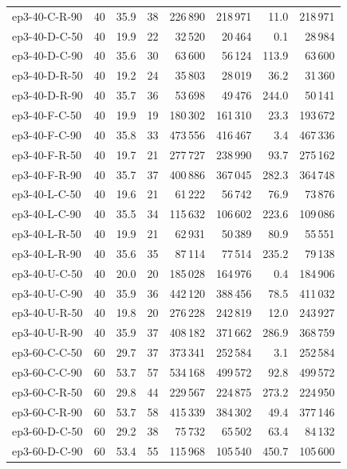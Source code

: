 \begin{longtable}{lrrrrrrr}
  ep3-40-C-R-90 & 40 & 35.9 & 38 & 226\,890 & 218\,971 & 11.0 & 218\,971 \\
  ep3-40-D-C-50 & 40 & 19.9 & 22 & 32\,520 & 20\,464 & 0.1 & 28\,984 \\
  ep3-40-D-C-90 & 40 & 35.6 & 30 & 63\,600 & 56\,124 & 113.9 & 63\,600 \\
  ep3-40-D-R-50 & 40 & 19.2 & 24 & 35\,803 & 28\,019 & 36.2 & 31\,360 \\
  ep3-40-D-R-90 & 40 & 35.7 & 36 & 53\,698 & 49\,476 & 244.0 & 50\,141 \\
  ep3-40-F-C-50 & 40 & 19.9 & 19 & 180\,302 & 161\,310 & 23.3 & 193\,672 \\
  ep3-40-F-C-90 & 40 & 35.8 & 33 & 473\,556 & 416\,467 & 3.4 & 467\,336 \\
  ep3-40-F-R-50 & 40 & 19.7 & 21 & 277\,727 & 238\,990 & 93.7 & 275\,162 \\
  ep3-40-F-R-90 & 40 & 35.7 & 37 & 400\,886 & 367\,045 & 282.3 & 364\,748 \\
  ep3-40-L-C-50 & 40 & 19.6 & 21 & 61\,222 & 56\,742 & 76.9 & 73\,876 \\
  ep3-40-L-C-90 & 40 & 35.5 & 34 & 115\,632 & 106\,602 & 223.6 & 109\,086 \\
  ep3-40-L-R-50 & 40 & 19.9 & 21 & 62\,931 & 50\,389 & 80.9 & 55\,551 \\
  ep3-40-L-R-90 & 40 & 35.6 & 35 & 87\,114 & 77\,514 & 235.2 & 79\,138 \\
  ep3-40-U-C-50 & 40 & 20.0 & 20 & 185\,028 & 164\,976 & 0.4 & 184\,906 \\
  ep3-40-U-C-90 & 40 & 35.9 & 36 & 442\,120 & 388\,456 & 78.5 & 411\,032 \\
  ep3-40-U-R-50 & 40 & 19.8 & 20 & 276\,228 & 242\,819 & 12.0 & 243\,927 \\
  ep3-40-U-R-90 & 40 & 35.9 & 37 & 408\,182 & 371\,662 & 286.9 & 368\,759 \\
  \addlinespace
  ep3-60-C-C-50 & 60 & 29.7 & 37 & 373\,341 & 252\,584 & 3.1 & 252\,584 \\
  ep3-60-C-C-90 & 60 & 53.7 & 57 & 534\,168 & 499\,572 & 92.8 & 499\,572 \\
  ep3-60-C-R-50 & 60 & 29.8 & 44 & 229\,567 & 224\,875 & 273.2 & 224\,950 \\
  ep3-60-C-R-90 & 60 & 53.7 & 58 & 415\,339 & 384\,302 & 49.4 & 377\,146 \\
  ep3-60-D-C-50 & 60 & 29.2 & 38 & 75\,732 & 65\,502 & 63.4 & 84\,132 \\
  ep3-60-D-C-90 & 60 & 53.4 & 55 & 115\,968 & 105\,540 & 450.7 & 105\,600 \\

\end{longtable}
